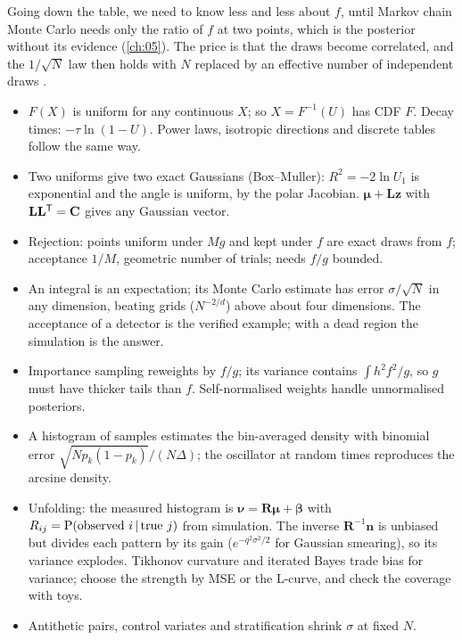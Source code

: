 Going down the table, we need to know less and less about $f$, until
Markov chain Monte Carlo needs only the ratio of $f$ at two points, which is the posterior
without its evidence (\cref{ch:05}). The price is that the draws become correlated, and the
$1/\sqrt N$ law then holds with $N$ replaced by an effective number of independent draws
.

\begin{recap}
\begin{itemize}[itemsep=1pt,leftmargin=1.2em]
  \item $F(X)$ is uniform for any continuous $X$; so $X=F^{-1}(U)$ has CDF $F$. Decay times:
        $-\tau\ln(1-U)$. Power laws, isotropic directions and discrete tables follow the same way.
  \item Two uniforms give two exact Gaussians (Box--Muller): $R^2=-2\ln U_1$ is exponential and
        the angle is uniform, by the polar Jacobian. $\bm\mu+\mathbf L\bm z$ with
        $\mathbf L\mathbf L^{\mathsf{T}}=\mathbf{C}$ gives any Gaussian vector.
  \item Rejection: points uniform under $Mg$ and kept under $f$ are exact draws from $f$;
        acceptance $1/M$, geometric number of trials; needs $f/g$ bounded.
  \item An integral is an expectation; its Monte Carlo estimate has error $\sigma/\sqrt N$ in
        any dimension, beating grids ($N^{-2/d}$) above about four dimensions. The acceptance of
        a detector is the verified example; with a dead region the simulation is the answer.
  \item Importance sampling reweights by $f/g$; its variance contains $\int h^2f^2/g$, so $g$
        must have thicker tails than $f$. Self-normalised weights handle unnormalised
        posteriors.
  \item A histogram of samples estimates the bin-averaged density with binomial error
        $\sqrt{Np_k(1-p_k)}/(N\Delta)$; the oscillator at random times reproduces the arcsine
        density.
  \item Unfolding: the measured histogram is $\bm\nu=\mathbf R\bm\mu+\bm\beta$ with
        $R_{ij}=\operatorname{P}(\text{observed }i\,\vert\,\text{true }j)$ from simulation. The inverse
        $\mathbf R^{-1}\bm n$ is unbiased but divides each pattern by its gain
        ($e^{-q^2\sigma^2/2}$ for Gaussian smearing), so its variance explodes. Tikhonov curvature
        and iterated Bayes trade bias for variance; choose the strength by MSE or the L-curve, and
        check the coverage with toys.
  \item Antithetic pairs, control variates and stratification shrink $\sigma$ at fixed $N$.
\end{itemize}
\end{recap}

